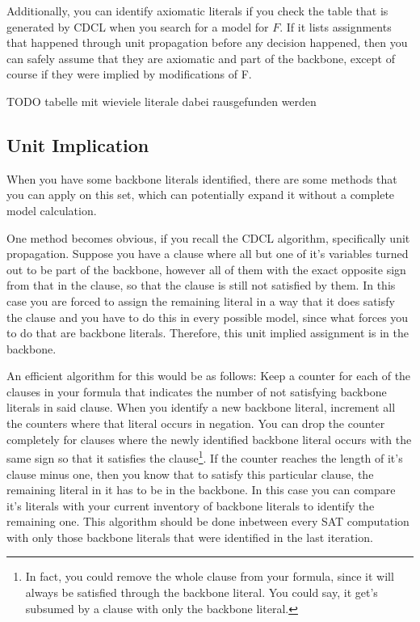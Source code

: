 Additionally, you can identify axiomatic literals if you check the table that is generated by CDCL when you search for a model for $F$. If it lists assignments that happened through unit propagation before any decision happened, then you can safely assume that they are axiomatic and part of the backbone, except of course if they were implied by modifications of F.

TODO tabelle mit wieviele literale dabei rausgefunden werden

\fi
\subsection{Unit Implication}
\label{subsec:unitImpl}

When you have some backbone literals identified, there are some methods that you can apply on this set, which can potentially expand it without a complete model calculation. 

One method becomes obvious, if you recall the CDCL algorithm, specifically unit propagation. Suppose you have a clause where all but one of it's variables turned out to be part of the backbone, however all of them with the exact opposite sign from that in the clause, so that the clause is still not satisfied by them. In this case you are forced to assign the remaining literal in a way that it does satisfy the clause and you have to do this in every possible model, since what forces you to do that are backbone literals. Therefore, this unit implied assignment is in the backbone.

An efficient algorithm for this would be as follows: Keep a counter for each of the clauses in your formula that indicates the number of not satisfying backbone literals in said clause. When you identify a new backbone literal, increment all the counters where that literal occurs in negation. You can drop the counter completely for clauses where the newly identified backbone literal occurs with the same sign so that it satisfies the clause\footnote{
	In fact, you could remove the whole clause from your formula, since it will always be satisfied through the backbone literal. You could say, it get's subsumed by a clause with only the backbone literal.}.
If the counter reaches the length of it's clause minus one, then you know that to satisfy this particular clause, the remaining literal in it has to be in the backbone. In this case you can compare it's literals with your current inventory of backbone literals to identify the remaining one. This algorithm should be done inbetween every SAT computation with only those backbone literals that were identified in the last iteration.

